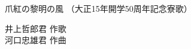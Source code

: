 \documentclass[10pt,b5j]{tarticle} %
\begin{document}
\begin{minipage}[c]{0.7\hsize} %
    \begin{center}
        {\LARGE
            爪紅の黎明の風 %
        }
        {\small 
            （大正15年開学50周年記念寮歌） %
        }
    \end{center}
\end{minipage}
\begin{minipage}[c]{0.3\hsize} %
    \begin{flushright} %
        井上哲郎君 作歌\\河口忠雄君 作曲 %
    \end{flushright}
\end{minipage}
\end{document}
